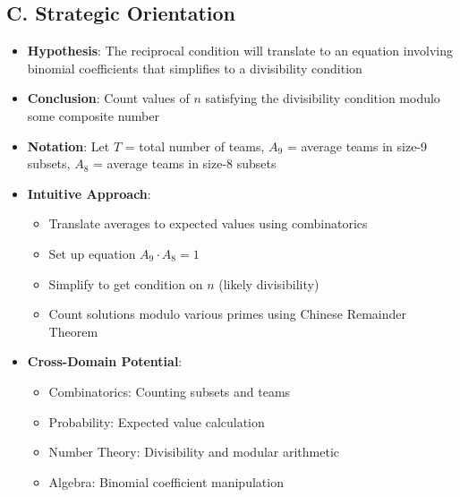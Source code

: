 \documentclass[]{article}
\begin{document}
\begin{problemconfigbox}
		\subsection*{C. Strategic Orientation}
		\begin{itemize}[leftmargin=*]
			\item \textbf{Hypothesis}: The reciprocal condition will translate to an equation involving binomial coefficients that simplifies to a divisibility condition
			\item \textbf{Conclusion}: Count values of $n$ satisfying the divisibility condition modulo some composite number
			\item \textbf{Notation}: Let $T$ = total number of teams, $A_9$ = average teams in size-9 subsets, $A_8$ = average teams in size-8 subsets
			\item \textbf{Intuitive Approach}: 
			\begin{itemize}
				\item Translate averages to expected values using combinatorics
				\item Set up equation $A_9 \cdot A_8 = 1$
				\item Simplify to get condition on $n$ (likely divisibility)
				\item Count solutions modulo various primes using Chinese Remainder Theorem
			\end{itemize}
			\item \textbf{Cross-Domain Potential}: 
			\begin{itemize}
				\item Combinatorics: Counting subsets and teams
				\item Probability: Expected value calculation
				\item Number Theory: Divisibility and modular arithmetic
				\item Algebra: Binomial coefficient manipulation
			\end{itemize}
		\end{itemize}
	\end{problemconfigbox}
	
\end{document}
